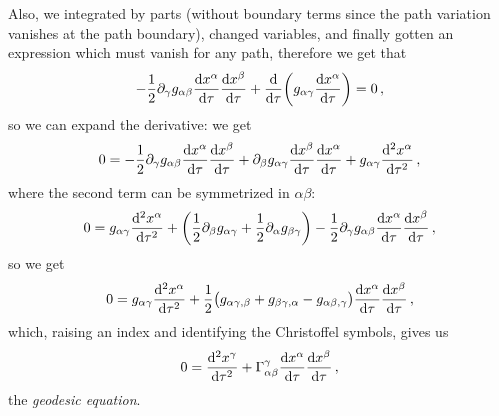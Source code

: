 \documentclass[main.tex]{subfiles}
\begin{document}
Also, we integrated by parts (without boundary terms since the path variation vanishes at the path boundary), changed variables, and finally gotten an expression which must vanish for any path, therefore we get that 
%
\begin{align}
    -\frac{1}{2} \partial_{\gamma }g_{\alpha \beta } \dv{x^{\alpha }}{\tau } \dv{x^{\beta }}{\tau } 
    + \dv{}{\tau } \qty(g_{\alpha \gamma } \dv{x^{\alpha }}{\tau }) = 0
\,,
\end{align}
%
so we can expand the derivative: we get 
%
\begin{align}
  0= - \frac{1}{2} \partial_{\gamma }g_{\alpha \beta } \dv{x^{\alpha }}{\tau } \dv{x^{\beta }}{\tau } + 
  \partial_{\beta }g_{\alpha \gamma } \dv{x^{\beta }}{\tau } \dv{x^{\alpha }}{\tau } + g_{\alpha \gamma } \dv[2]{x^{\alpha }}{\tau }
\,,
\end{align}
%
where the second term can be symmetrized in \(\alpha \beta \): 
%
\begin{align}
  0= g_{\alpha \gamma } \dv[2]{x^{\alpha }}{\tau } +
  \qty(\frac{1}{2} \partial_{\beta }g_{\alpha \gamma } + \frac{1}{2}\partial_{\alpha } g_{\beta \gamma }) - \frac{1}{2}\partial_{\gamma }g_{\alpha \beta } \dv{x^{\alpha }}{\tau } \dv{x^{\beta }}{\tau }
\,,
\end{align}
%
so we get 
%
\begin{align}
  0= g_{\alpha \gamma } \dv[2]{x^{\alpha }}{\tau } +
  \frac{1}{2}\qty(g_{\alpha \gamma , \beta } + g_{\beta \gamma , \alpha } - g_{\alpha \beta , \gamma })
  \dv{x^{\alpha }}{\tau } \dv{x^{\beta }}{\tau }
\,,
\end{align}
%
which, raising an index and identifying the Christoffel symbols, gives us 
%
\begin{align}
  0 = \dv[2]{x^{\gamma }}{\tau } + \Gamma^{\gamma }_{\alpha \beta } \dv{x^{\alpha }}{\tau } \dv{x^{\beta }}{\tau }
\,,
\end{align}
%
the \emph{geodesic equation}.
\end{document}
